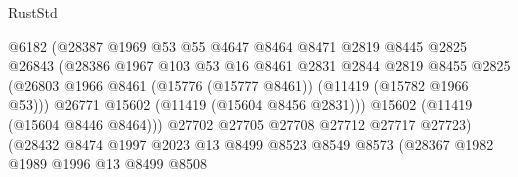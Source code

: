 \begin{lexlean}{RustStd}
\begin{coremodule}
                                      @6182
                                      (@28387
                                        @1969
                                        @53
                                        @55
                                        @4647
                                        @8464
                                        @8471
                                        @2819
                                        @8445
                                        @2825
                                        @26843
                                        (@28386
                                          @1967
                                          @103
                                          @53
                                          @16
                                          @8461
                                          @2831
                                          @2844
                                          @2819
                                          @8455
                                          @2825
                                          (@26803
                                            @1966
                                            @8461
                                            (@15776 (@15777 @8461))
                                            (@11419 (@15782 @1966 @53)))
                                          @26771
                                          @15602
                                          (@11419 (@15604 @8456 @2831)))
                                        @15602
                                        (@11419 (@15604 @8446 @8464)))
                                      @27702
                                      @27705
                                      @27708
                                      @27712
                                      @27717
                                      @27723)
                                    (@28432
                                      @8474
                                      @1997
                                      @2023
                                      @13
                                      @8499
                                      @8523
                                      @8549
                                      @8573
                                      (@28367
                                        @1982
                                        @1989
                                        @1996
                                        @13
                                        @8499
                                        @8508

\end{coremodule}
\end{lexlean}
